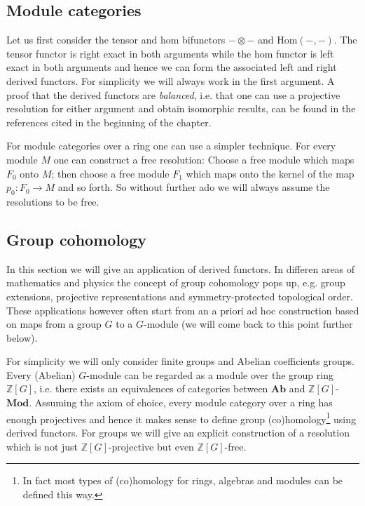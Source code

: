 \subsection{Module categories}\label{section:tor_ext}

	Let us first consider the tensor and hom bifunctors $-\otimes-$ and Hom$(-, -)$. The tensor functor is right exact in both arguments while the hom functor is left exact in both arguments and hence we can form the associated left and right derived functors. For simplicity we will always work in the first argument. A proof that the derived functors are \textit{balanced}, i.e. that one can use a projective resolution for either argument and obtain isomorphic results, can be found in the references cited in the beginning of the chapter.
	
	
	
	For module categories over a ring one can use a simpler technique. For every module $M$ one can construct a free resolution: Choose a free module which maps $F_0$ onto $M$; then choose a free module $F_1$ which maps onto the kernel of the map $p_0:F_0\rightarrow M$ and so forth. So without further ado we will always assume the resolutions to be free.

\subsection{Group cohomology}\label{section:group_cohomology}

	In this section we will give an application of derived functors. In differen areas of mathematics and physics the concept of group cohomology pops up, e.g. group extensions, projective representations and symmetry-protected topological order. These applications however often start from an a priori ad hoc construction based on maps from a group $G$ to a $G$-module (we will come back to this point further below).
	
	For simplicity we will only consider finite groups and Abelian coefficients groups. Every (Abelian) $G$-module can be regarded as a module over the group ring $\mathbb{Z}[G]$, i.e. there exists an equivalences of categories between $\mathbf{Ab}$ and $\mathbb{Z}[G]$-$\mathbf{Mod}$. Assuming the axiom of choice, every module category over a ring has enough projectives and hence it makes sense to define group (co)homology\footnote{In fact most types of (co)homology for rings, algebras and modules can be defined this way.} using derived functors. For groups we will give an explicit construction of a resolution which is not just $\mathbb{Z}[G]$-projective but even $\mathbb{Z}[G]$-free.
	
